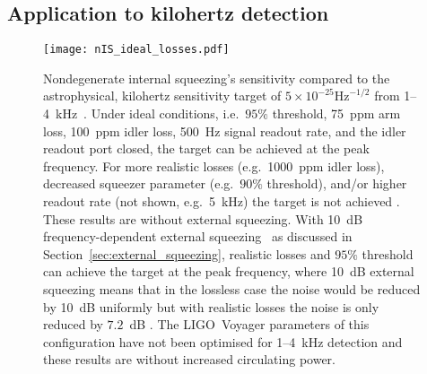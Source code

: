 \subsection{Application to kilohertz detection}

\begin{figure}
    \centering
    \texttt{[image: nIS\_ideal\_losses.pdf]}
    \caption{   Nondegenerate internal squeezing's sensitivity compared to the astrophysical, kilohertz sensitivity target of $5\times10^{-25}\text{Hz}^{-1/2}$ from 1--4~kHz~\cite{miaoDesignGravitationalWaveDetectors2018}. Under ideal conditions, i.e.\ $95\%$ threshold, 75~ppm arm loss, 100~ppm idler loss, 500~Hz signal readout rate, and the idler readout port closed, the target can be achieved at the peak frequency. For more realistic losses (e.g.\ 1000~ppm idler loss), decreased squeezer parameter (e.g.\ $90\%$ threshold), and/or higher readout rate (not shown, e.g.\ 5~kHz) the target is not achieved . These results are without external squeezing. With 10~dB frequency-dependent external squeezing~\cite{} as discussed in Section~\ref{sec:external_squeezing}, realistic losses and $95\%$ threshold can achieve the target at the peak frequency, where 10~dB external squeezing means that in the lossless case the noise would be reduced by 10~dB uniformly but with realistic losses the noise is only reduced by $7.2$~dB .
    The LIGO~Voyager parameters of this configuration have not been optimised for 1--4~kHz detection and these results are without increased circulating power.}
    \label{fig:nIS_sens_target}
\end{figure}

